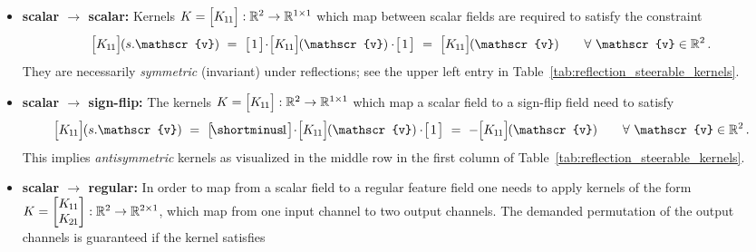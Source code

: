 \begin{itemize}
\setlength{\itemindent}{-2em}
\setlength{\itemsep}{.5em}
    \item[{\rule[2.0pt]{2pt}{2pt}}]
    \textbf{scalar $\bm\to$ scalar:}
        Kernels
        $K = \pig[\Koo\pig]: \R^2 \to \R^{1\times1}$
        which map between scalar fields are required to satisfy the constraint
        \begin{align}
                \pig[\Koo\pig] \mkern-1mu (s.\mathscr{v})
            \ =\ 
                \big[\mkern2mu 1 \mkern2mu\big]
                \!\cdot\!
                \pig[\Koo\pig] \mkern-1mu (\mathscr{v})
                \cdot\!
                \big[\mkern2mu 1 \mkern2mu\big]
            \ =\ 
                \pig[\Koo\pig] \mkern-1mu (\mathscr{v})
            \qquad \forall\ \mathscr{v} \in \R^2 \,.
        \end{align}
        They are necessarily \emph{symmetric} (invariant) under reflections; see the upper left entry in Table~\ref{tab:reflection_steerable_kernels}.
    \item[{\rule[2.0pt]{2pt}{2pt}}]
    \textbf{scalar $\bm\to$ sign-flip:}
        The kernels $K = \pig[\Koo\pig]: \R^2 \to \R^{1\times1}$ which map a scalar field to a sign-flip field need to satisfy
        \begin{align}
                \pig[\Koo\pig] \mkern-1mu (s.\mathscr{v})
            \ =\ 
                \big[\! \shortminus\!1 \big]
                \!\cdot\!
                \pig[\Koo\pig] \mkern-1mu (\mathscr{v})
                \cdot\!
                \big[\mkern2mu 1 \mkern2mu\big]
            \ =\
                -\pig[\Koo\pig] \mkern-1mu (\mathscr{v})
            \qquad \forall\ \mathscr{v} \in \R^2 \,.
        \end{align}
        This implies \emph{antisymmetric} kernels as visualized in the middle row in the first column of Table~\ref{tab:reflection_steerable_kernels}.
    \item[{\rule[2.0pt]{2pt}{2pt}}]
    \textbf{scalar $\bm\to$ regular:}
        In order to map from a scalar field to a regular feature field one needs to apply kernels of the form
        $K = \begin{bmatrix} K_{\mkern-1mu 1 \mkern-1mu 1} \\ K_{\mkern-1mu 2 \mkern-1mu 1} \end{bmatrix}: \mathbb{R}^2 \to \mathbb{R}^{2\times1}$,
        which map from one input channel to two output channels.
        The demanded permutation of the output channels is guaranteed if the kernel satisfies
        \begin{align}\label{eq:constraint_s2r}

\end{align}
\end{itemize}
